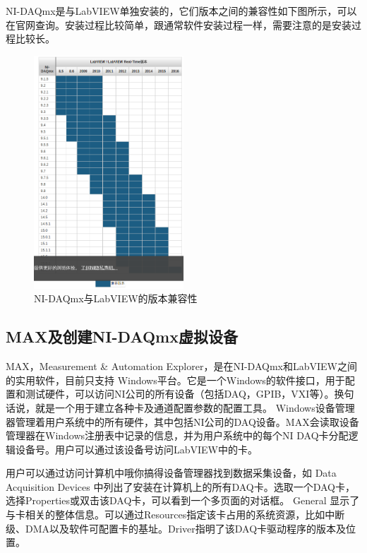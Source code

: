 NI-DAQmx是与LabVIEW单独安装的，它们版本之间的兼容性如下图所示，可以在官网查询。安装过程比较简单，跟通常软件安装过程一样，需要注意的是安装过程比较长。
\begin{figure}[h!]
\centering
\includegraphics[width=0.5\textwidth]{pictures/ni-daqmx.png}
\caption{NI-DAQmx与LabVIEW的版本兼容性}
\end{figure}


\subsection{MAX及创建NI-DAQmx虚拟设备}
MAX，Measurement \& Automation Explorer，是在NI-DAQmx和LabVIEW之间的实用软件，目前只支持 Windows平台。它是一个Windows的软件接口，用于配置和测试硬件，可以访问NI公司的所有设备（包括DAQ，GPIB，VXI等）。换句话说，就是一个用于建立各种卡及通道配置参数的配置工具。 Windows设备管理器管理着用户系统中的所有硬件，其中包括NI公司的DAQ设备。MAX会读取设备管理器在Windows注册表中记录的信息，并为用户系统中的每个NI DAQ卡分配逻辑设备号。用户可以通过该设备号访问LabVIEW中的卡。

用户可以通过访问计算机中哦你搞得设备管理器找到数据采集设备，如 Data Acquisition Devices 中列出了安装在计算机上的所有DAQ卡。选取一个DAQ卡，选择Properties或双击该DAQ卡，可以看到一个多页面的对话框。 General 显示了与卡相关的整体信息。可以通过Resources指定该卡占用的系统资源，比如中断级、DMA以及软件可配置卡的基址。Driver指明了该DAQ卡驱动程序的版本及位置。

